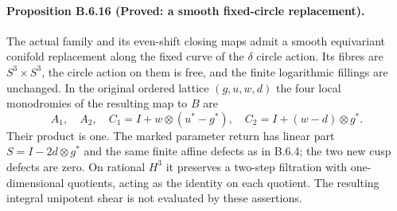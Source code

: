 \paragraph{Proposition B.6.16 (Proved: a smooth fixed-circle replacement).}
The actual family and its even-shift closing maps admit a smooth
equivariant conifold replacement along the fixed curve of the
$\delta$ circle action.  Its fibres are $S^3\times S^3$, the circle
action on them is free, and the finite logarithmic fillings are
unchanged.  In the original ordered lattice $(g,u,w,d)$ the four
local monodromies of the resulting map to $B$ are
\[
 A_1,\quad A_2,\quad
 C_1=I+w\otimes(u^*-g^*),\quad
 C_2=I+(w-d)\otimes g^*.
 \tag{B.6.27}
\]
Their product is one.  The marked parameter return has linear part
$S=I-2d\otimes g^*$ and the same finite affine defects as in
B.6.4; the two new cusp defects are zero.  On rational $H^3$ it
preserves a two-step filtration with one-dimensional quotients,
acting as the identity on each quotient.  The resulting integral
unipotent shear is not evaluated by these assertions.
